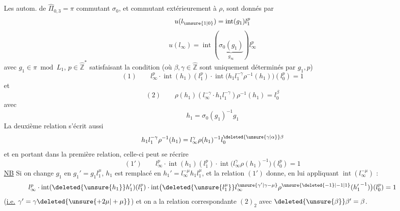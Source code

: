 Les autom.  de $\hat\Pi_{0,3}=\pi$ commutant  $\sigma_0$, et commutant extérieurement à $\rho$, sont donnés par
\[
u(l_{\unsure{1|0}})=\operatorname{int}(g_1)l_1^{p}
\]
\[
u(l_\infty)=\operatorname{int}(\underbrace{\sigma_0(g_1)}_{g_\infty})l_\infty^{p}
\]
avec $g_1\in\pi\bmod L_1$, $p\in\hat{\mathbb Z}^{*}$ satisfaisant la condition (où $\beta,\gamma\in\hat{\mathbb Z}$ sont uniquement déterminés par $g_1,p$)
\[
(1)\qquad\boxed{l_\infty^{p}\cdot\operatorname{int}(h_1)(l_1^{p})\cdot\operatorname{int}\bigl(h_1l_1^{-\gamma}\rho^{-1}(h_1)\bigr)(l_0^{p})=1}
\]
et
\[
(2)\qquad\boxed{\rho(h_1)(l_\infty^{-\gamma}\cdot h_1l_1^{-\gamma})\rho^{-1}(h_1)=l_0^\beta}
\]
avec
\[
h_1=\sigma_0(g_1)^{-1}g_1
\]
La deuxième relation s'écrit aussi
\[
h_1l_1^{-\gamma}\rho^{-1}(h_1)=l_\infty^\gamma\rho(h_1)^{-1}l_0^{\deleted{\unsure{\gamma|\alpha}}\beta}
\]
et en portant dans la première relation, celle-ci peut se récrire
\[
(1')\qquad\boxed{l_\infty^{p}\cdot\operatorname{int}(h_1)(l_1^{p})\cdot\operatorname{int}\bigl(l_\infty^\gamma\rho(h_1)^{-1}\bigr)(l_0^{p})=1}
\]
\uline{NB} Si on change $g_1$ en $g_1'=g_1l_1^\mu$, $h_1$ est remplacé en $h_1'=l_\infty^{-\mu}h_1l_1^\mu$, et la relation $(1')$ donne, en lui appliquant $\operatorname{int}(l_\infty^{-\mu})$ :
\[
l_\infty^{p}\cdot\operatorname{int}(\deleted{\unsure{h_1}}h_1')(l_1^{p})\cdot\operatorname{int}\bigl(\deleted{\unsure{l_1^\mu}}l_\infty^{\unsure{\gamma'|\gamma-\mu}}\rho^{\unsure{\deleted{-1}|-1|1}}({h_1'}^{-1})\bigr)(l_0^{p})=1
\]
(\uline{i.e.} \uline{$\gamma'=\gamma\deleted{\unsure{+2\mu|+\mu}}$}) et on a la relation correspondante  $(2)_2$ avec $\deleted{\unsure{\beta}}\beta'=\beta$.
